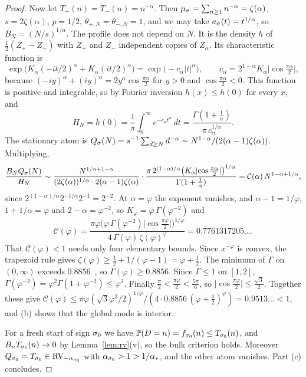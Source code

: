 \begin{proof}
Now let $T_\plus(n)=T_\minus(n)=n^{-\alpha}$. Then $\mu_\sigma=\sum_{n\ge1}n^{-\alpha}=\zeta(\alpha)$,
$s=2\zeta(\alpha)$, $p=1/2$, $\theta_{\plus,N}=\theta_{\minus,N}=1$, and we may take
$a_\sigma(t)=t^{1/\alpha}$, so $B_N=(N/s)^{1/\alpha}$. The profile does not depend on $N$.
It is the density $h$ of $\frac12(Z_\plus-Z_\minus)$ with $Z_\plus$ and $Z_\minus$
independent copies of $Z_\alpha$. Its characteristic function is
\[
 \exp\bigl(K_\alpha(-it/2)^\alpha+K_\alpha(it/2)^\alpha\bigr)
 =\exp\bigl(-c_\alpha|t|^\alpha\bigr),\qquad c_\alpha=2^{1-\alpha}K_\alpha\bigl\lvert\cos\tfrac{\pi\alpha}2\bigr\rvert ,
\]
because $(-iy)^\alpha+(iy)^\alpha=2y^\alpha\cos\frac{\pi\alpha}2$ for $y>0$ and
$\cos\frac{\pi\alpha}2<0$. This function is positive and integrable, so by
Fourier inversion $h(x)\le h(0)$ for every $x$, and
\[
 H_N=h(0)=\frac1\pi\int_0^\infty e^{-c_\alpha t^\alpha}\,dt
 =\frac{\Gamma(1+\frac1\alpha)}{\pi\,c_\alpha^{1/\alpha}} .
\]
The stationary atom is $Q_\sigma(N)=s^{-1}\sum_{d\ge N}d^{-\alpha}\sim
N^{1-\alpha}/(2(\alpha-1)\zeta(\alpha))$. Multiplying,
\[
 \frac{B_NQ_\sigma(N)}{H_N}\sim\frac{N^{1/\alpha+1-\alpha}}{(2\zeta(\alpha))^{1/\alpha}\cdot2(\alpha-1)\zeta(\alpha)}
 \cdot\frac{\pi\,2^{(1-\alpha)/\alpha}\bigl(K_\alpha\lvert\cos\frac{\pi\alpha}2\rvert\bigr)^{1/\alpha}}{\Gamma(1+\frac1\alpha)}
 =\mathcal C(\alpha)\,N^{1-\alpha+1/\alpha},
\]
since $2^{(1-\alpha)/\alpha}2^{-1/\alpha}2^{-1}=2^{-2}$. At $\alpha=\varphi$ the
exponent vanishes, and $\alpha-1=1/\varphi$, $1+1/\alpha=\varphi$ and
$2-\alpha=\varphi^{-2}$, so $K_\varphi=\varphi\,\Gamma(\varphi^{-2})$ and
\[
 \mathcal C(\varphi)=\frac{\pi\varphi\bigl(\varphi\,\Gamma(\varphi^{-2})\lvert\cos\frac{\pi\varphi}2\rvert\bigr)^{1/\varphi}}
 {4\,\Gamma(\varphi)\,\zeta(\varphi)^{\varphi}}=0.7761317205\ldots .
\]
That $\mathcal C(\varphi)<1$ needs only four elementary bounds. Since $x^{-\varphi}$ is
convex, the trapezoid rule gives $\zeta(\varphi)\ge\frac12+1/(\varphi-1)=\varphi+\frac12$.
The minimum of $\Gamma$ on $(0,\infty)$ exceeds $0.8856$~\cite[Section~5.4(iii)]{dlmf},
so $\Gamma(\varphi)\ge0.8856$. Since $\Gamma\le1$ on $[1,2]$,
$\Gamma(\varphi^{-2})=\varphi^2\Gamma(1+\varphi^{-2})\le\varphi^2$. Finally
$\frac\pi2<\frac{\pi\varphi}2<\frac{5\pi}6$, so $\lvert\cos\frac{\pi\varphi}2\rvert\le\frac{\sqrt3}2$.
Together these give $\mathcal C(\varphi)\le\pi\varphi(\sqrt3\varphi^3/2)^{1/\varphi}/(4\cdot0.8856\,(\varphi+\frac12)^\varphi)=0.9513\ldots<1$,
and (b) shows that the global mode is interior.

For a fresh start of sign $\sigma_0$ we have $\mathbb{P}(D=n)=f_{\sigma_0}(n)\le T_{\sigma_0}(n)$,
and $B_nT_{\sigma_0}(n)\to0$ by Lemma~\ref{lem:rv}(v), so the bulk criterion holds.
Moreover $Q_{\sigma_0}=T_{\sigma_0}\in\mathrm{RV}_{-\alpha_{\sigma_0}}$ with
$\alpha_{\sigma_0}>1>1/\alpha_*$, and the other atom vanishes. Part (c) concludes.
\end{proof}

